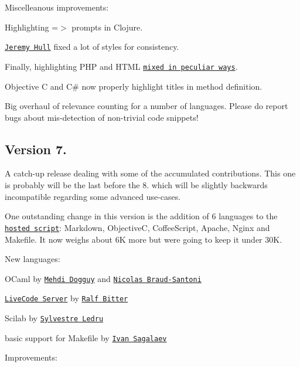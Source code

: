Miscelleanous improvements\+:


\begin{DoxyItemize}
\item Highlighting {\ttfamily =$>$} prompts in Clojure.
\item \href{https://github.com/sourrust}{\tt Jeremy Hull} fixed a lot of styles for consistency.
\item Finally, highlighting P\+HP and H\+T\+ML \href{https://twitter.com/highlightjs/status/408890903017689088}{\tt mixed in peculiar ways}.
\item Objective C and C\# now properly highlight titles in method definition.
\item Big overhaul of relevance counting for a number of languages. Please do report bugs about mis-\/detection of non-\/trivial code snippets!
\end{DoxyItemize}

\subsection*{Version 7.}

A catch-\/up release dealing with some of the accumulated contributions. This one is probably will be the last before the 8. which will be slightly backwards incompatible regarding some advanced use-\/cases.

One outstanding change in this version is the addition of 6 languages to the \href{/soft/highlight/en/download/}{\tt hosted script}\+: Markdown, ObjectiveC, Coffee\+Script, Apache, Nginx and Makefile. It now weighs about 6K more but we\textquotesingle{}re going to keep it under 30K.

New languages\+:


\begin{DoxyItemize}
\item O\+Caml by \href{https://github.com/mehdid}{\tt Mehdi Dogguy} and \href{https://github.com/nbraud}{\tt Nicolas Braud-\/\+Santoni}
\item \href{http://livecode.com/developers/guides/server/}{\tt Live\+Code Server} by \href{https://github.com/revig}{\tt Ralf Bitter}
\item Scilab by \href{https://github.com/sylvestre}{\tt Sylvestre Ledru}
\item basic support for Makefile by \href{https://github.com/isagalaev}{\tt Ivan Sagalaev}
\end{DoxyItemize}

Improvements\+:


